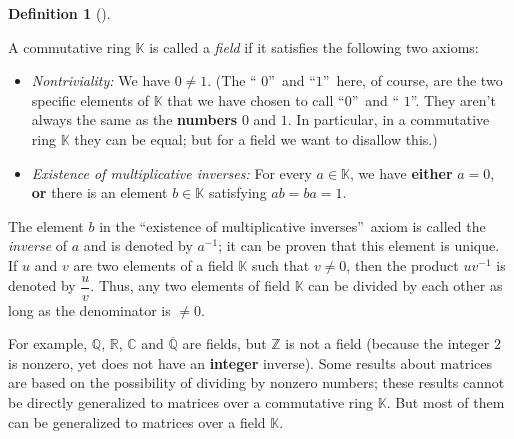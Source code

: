\documentclass[numbers=enddot,12pt,final,onecolumn,notitlepage]{scrartcl}%
\theoremstyle{definition}
\newtheorem{defi}[theo]{Definition}
\newenvironment{definition}[1][]
{\begin{defi}[#1]\begin{leftbar}}
{\end{leftbar}\end{defi}}
\begin{document}
\begin{definition}
\label{def.field}A commutative ring $\mathbb{K}$ is called a \textit{field} if
it satisfies the following two axioms:

\begin{itemize}
\item \textit{Nontriviality:} We have $0\neq1$. (The \textquotedblleft%
$0$\textquotedblright\ and \textquotedblleft$1$\textquotedblright\ here, of
course, are the two specific elements of $\mathbb{K}$ that we have chosen to
call \textquotedblleft$0$\textquotedblright\ and \textquotedblleft%
$1$\textquotedblright. They aren't always the same as the \textbf{numbers} $0$
and $1$. In particular, in a commutative ring $\mathbb{K}$ they can be equal;
but for a field we want to disallow this.)

\item \textit{Existence of multiplicative inverses:} For every $a\in
\mathbb{K}$, we have \textbf{either} $a=0$, \textbf{or} there is an element
$b\in\mathbb{K}$ satisfying $ab=ba=1$.
\end{itemize}

The element $b$ in the \textquotedblleft existence of multiplicative
inverses\textquotedblright\ axiom is called the \textit{inverse} of $a$ and is
denoted by $a^{-1}$; it can be proven that this element is unique. If $u$ and
$v$ are two elements of a field $\mathbb{K}$ such that $v\neq0$, then the
product $uv^{-1}$ is denoted by $\dfrac{u}{v}$. Thus, any two elements of
field $\mathbb{K}$ can be divided by each other as long as the denominator is
$\neq0$.
\end{definition}

For example, $\mathbb{Q}$, $\mathbb{R}$, $\mathbb{C}$ and $\overline
{\mathbb{Q}}$ are fields, but $\mathbb{Z}$ is not a field (because the integer
$2$ is nonzero, yet does not have an \textbf{integer} inverse). Some results
about matrices are based on the possibility of dividing by nonzero numbers;
these results cannot be directly generalized to matrices over a commutative
ring $\mathbb{K}$. But most of them can be generalized to matrices over a
field $\mathbb{K}$.
\end{document}
